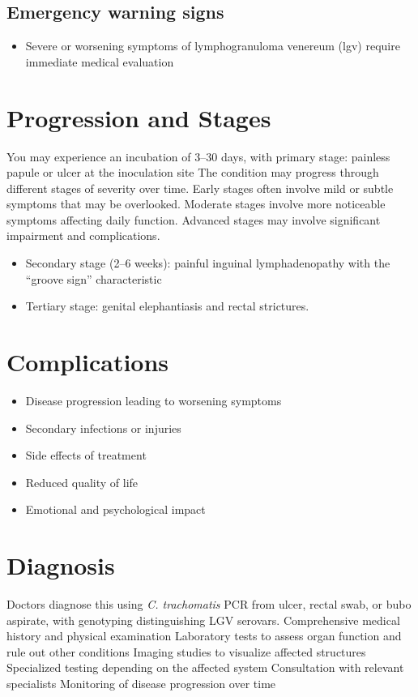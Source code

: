 \subsection{Emergency warning signs}
\begin{itemize}[noitemsep]
  \item Severe or worsening symptoms of lymphogranuloma venereum (lgv) require immediate medical evaluation
\end{itemize}
\section{Progression and Stages}
You may experience an incubation of 3--30 days, with primary stage: painless papule or ulcer at the inoculation site The condition may progress through different stages of severity over time. Early stages often involve mild or subtle symptoms that may be overlooked. Moderate stages involve more noticeable symptoms affecting daily function. Advanced stages may involve significant impairment and complications.

\begin{itemize}[noitemsep]
  \item Secondary stage (2--6 weeks): painful inguinal lymphadenopathy with the ``groove sign'' characteristic
  \item Tertiary stage: genital elephantiasis and rectal strictures.
\end{itemize}
\section{Complications}
\begin{itemize}[noitemsep]
  \item Disease progression leading to worsening symptoms
  \item Secondary infections or injuries
  \item Side effects of treatment
  \item Reduced quality of life
  \item Emotional and psychological impact
\end{itemize}
\section{Diagnosis}
Doctors diagnose this using \textit{C. trachomatis} PCR from ulcer, rectal swab, or bubo aspirate, with genotyping distinguishing LGV serovars. Comprehensive medical history and physical examination Laboratory tests to assess organ function and rule out other conditions Imaging studies to visualize affected structures Specialized testing depending on the affected system Consultation with relevant specialists Monitoring of disease progression over time

